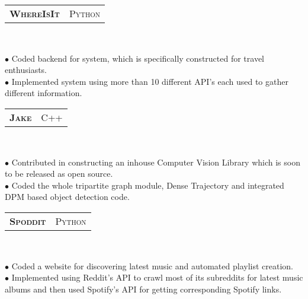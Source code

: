\documentclass[10pt,a4paper,oneside]{article}
\begin{document}
    \vspace{-6pt}
    \begin{tabular}{c|c}
        \textbf{\normalsize W\textsc{here}I\textsc{s}I\textsc{t}}
        &\textmd{\normalsize P\textsc{ython}}
    \end{tabular}\\
     \vspace{-4mm}
    \begin{adjustwidth}{7pt}{0pt}
            {\footnotesize $\bullet$ Coded backend for system, which is specifically constructed for travel enthusiasts.\\ 
            $\bullet$ Implemented system using more than 10 different API's each used to gather different information.}\\ 
    \end{adjustwidth}
    \vspace{-6pt}
    \begin{tabular}{c|c}
        \textbf{\normalsize J\textsc{ake}}
        &\textmd{\normalsize C\textsc{++}}
    \end{tabular}\\
     \vspace{-4mm}
    \begin{adjustwidth}{7pt}{0pt}
        {\footnotesize $\bullet$ Contributed in constructing an inhouse Computer Vision Library which is soon to be released as open source.\\
        $\bullet$ Coded the whole tripartite graph module, Dense Trajectory and integrated DPM based object detection code.}\\
    \end{adjustwidth}
    \vspace{-6pt}
    \begin{tabular}{c|c}
        \textbf{\normalsize S\textsc{poddit}}
        &\textmd{\normalsize P\textsc{ython}}
    \end{tabular}\\
     \vspace{-4mm}
    \begin{adjustwidth}{7pt}{0pt}
        {\footnotesize $\bullet$ Coded a website for discovering latest music and automated playlist creation.\\ 
        $\bullet$ Implemented using Reddit's API to crawl most of its subreddits for latest music albums and then used Spotify's API for getting corresponding Spotify links.}\\
    \end{adjustwidth}
    \vspace{-6pt}
\end{document}

